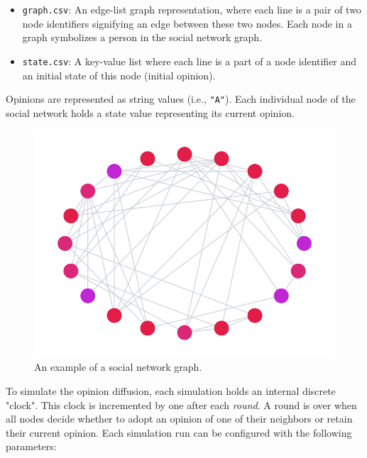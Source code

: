 \documentclass[11pt]{article}
\begin{document}
\begin{itemize}
	\setlength\itemsep{0.2em}

	\item \verb|graph.csv|: An edge-list graph representation, where each line is a pair of two node identifiers signifying an edge between these two nodes. Each node in a graph symbolizes a person in the social network graph.
	\item \verb|state.csv|: A key-value list where each line is a part of a node identifier and an initial state of this node (initial opinion).
\end{itemize}

\noindent Opinions are represented as string values (i.e., \verb|"A"|). Each individual node of the social network holds a state value representing its current opinion.

\begin{figure}[H]
  \centering
  \includegraphics[width=0.8\linewidth]{snapshot}
  \caption{An example of a social network graph.}
\end{figure}

\medskip

\noindent To simulate the opinion diffusion, each simulation holds an internal discrete "clock". This clock is incremented by one after each \emph{round}. A round is over when all nodes decide whether to adopt an opinion of one of their neighbors or retain their current opinion. Each simulation run can be configured with the following parameters:
\end{document}
